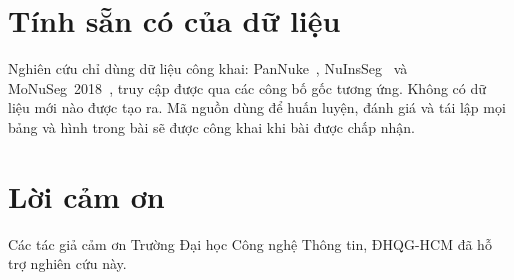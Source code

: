 \documentclass[preprint,12pt]{elsarticle}
\begin{document}
\section*{Tính sẵn có của dữ liệu}
Nghiên cứu chỉ dùng dữ liệu công khai: PanNuke~\cite{pannuke}, NuInsSeg~\cite{nuinsseg} và
MoNuSeg~2018~\cite{monuseg}, truy cập được qua các công bố gốc tương ứng. Không có dữ liệu mới nào được tạo ra. Mã
nguồn dùng để huấn luyện, đánh giá và tái lập mọi bảng và hình trong bài sẽ được công khai khi bài được chấp nhận.

\section*{Lời cảm ơn}
Các tác giả cảm ơn Trường Đại học Công nghệ Thông tin, ĐHQG-HCM đã hỗ trợ nghiên cứu này.



\end{document}
